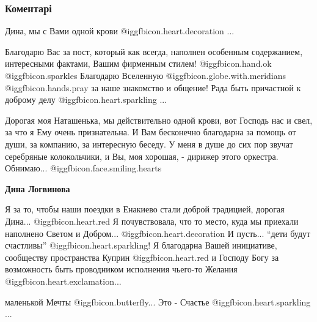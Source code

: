  
 
 
 
 
\subsubsection{Коментарі}
\label{sec:18_11_2021.fb.logvinova_dina.doneck.dnr.1.jenakievo_mamina_kolybeljnaja.cmt}

\begin{itemize} %

Дина, мы с Вами одной
крови @igg{fbicon.heart.decoration} ...

Благодарю Вас за пост, который как всегда, наполнен особенным содержанием,
интересными фактами, Вашим фирменным стилем!
@igg{fbicon.hand.ok}  @igg{fbicon.sparkles} Благодарю
Вселенную @igg{fbicon.globe.with.meridians}  @igg{fbicon.hands.pray}  за наше знакомство и
общение! Рада быть причастной к доброму делу
@igg{fbicon.heart.sparkling} ...

\begin{itemize} %

Дорогая моя Наташенька, мы действительно одной крови, вот Господь нас и свел,
за что я Ему очень признательна. И Вам бесконечно благодарна за помощь от души,
за компанию, за интересную беседу. У меня в душе до сих пор звучат серебряные
колокольчики, и Вы, моя хорошая, - дирижер этого оркестра. Обнимаю... @igg{fbicon.face.smiling.hearts} 

\textbf{Дина Логвинова} 

Я за то, чтобы наши поездки в Енакиево стали доброй традицией, дорогая Дина... @igg{fbicon.heart.red} Я
почувствовала, что то место, куда мы приехали наполнено Светом и Добром... @igg{fbicon.heart.decoration}  И
пусть... \enquote{дети будут счастливы} @igg{fbicon.heart.sparkling}! Я благодарна Вашей инициативе, сообществу
пространства Куприн @igg{fbicon.heart.red} и Господу Богу за возможность быть проводником исполнения
чьего-то Желания @igg{fbicon.heart.exclamation}...

маленькой Мечты @igg{fbicon.butterfly}... Это - Счастье  @igg{fbicon.heart.sparkling} ...


\end{itemize}
\end{itemize}
